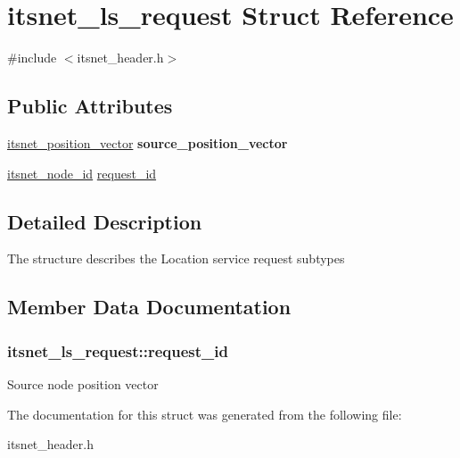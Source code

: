 \hypertarget{structitsnet__ls__request}{\section{itsnet\-\_\-ls\-\_\-request \-Struct \-Reference}
\label{structitsnet__ls__request}
}


{\ttfamily \#include $<$itsnet\-\_\-header.\-h$>$}

\subsection*{\-Public \-Attributes}
\begin{DoxyCompactItemize}
\item 
\hypertarget{structitsnet__ls__request_a30bc2b2ea24ba4ab5fadbb4c40b21ac5}{\hyperlink{structitsnet__position__vector}{itsnet\-\_\-position\-\_\-vector} {\bfseries source\-\_\-position\-\_\-vector}}\label{structitsnet__ls__request_a30bc2b2ea24ba4ab5fadbb4c40b21ac5}

\item 
\hyperlink{structitsnet__node__id}{itsnet\-\_\-node\-\_\-id} \hyperlink{structitsnet__ls__request_a0d397a49f2797a44efedd12550a05134}{request\-\_\-id}
\end{DoxyCompactItemize}


\subsection{\-Detailed \-Description}
\-The structure describes the \-Location service request subtypes 

\subsection{\-Member \-Data \-Documentation}
\hypertarget{structitsnet__ls__request_a0d397a49f2797a44efedd12550a05134}{
\subsubsection[{request\-\_\-id}]{ {\bf itsnet\-\_\-ls\-\_\-request\-::request\-\_\-id}}}\label{structitsnet__ls__request_a0d397a49f2797a44efedd12550a05134}
\-Source node position vector 

\-The documentation for this struct was generated from the following file\-:\begin{DoxyCompactItemize}
\item 
itsnet\-\_\-header.\-h\end{DoxyCompactItemize}
